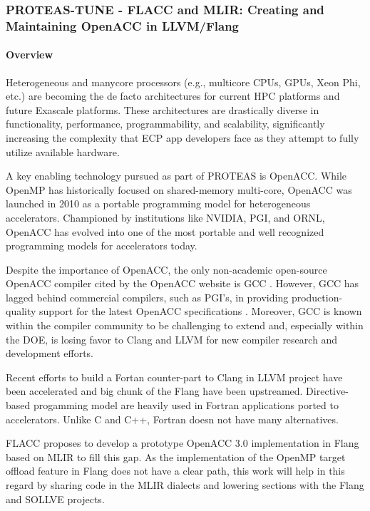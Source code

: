 \subsubsection{ PROTEAS-TUNE - FLACC and MLIR: Creating and Maintaining OpenACC in LLVM/Flang}\label{s:flacc}

\paragraph{Overview}
Heterogeneous and manycore processors (e.g., multicore CPUs, GPUs,
Xeon Phi, etc.) are becoming the de facto architectures for current
HPC platforms and future Exascale platforms.  These architectures are
drastically diverse in functionality, performance, programmability,
and scalability, significantly increasing the complexity that ECP app
developers face as they attempt to fully utilize available hardware.

A key enabling technology pursued as part of PROTEAS is OpenACC.
While OpenMP has historically focused on shared-memory multi-core,
OpenACC was launched in 2010 as a portable programming model for
heterogeneous accelerators.  Championed by institutions like NVIDIA,
PGI, and ORNL, OpenACC has evolved into one of the most portable and
well recognized programming models for accelerators today.

Despite the importance of OpenACC, the only non-academic open-source OpenACC
compiler cited by the OpenACC website is GCC \cite{openaccOrgTools}.
However, GCC has lagged behind commercial compilers, such as PGI's, in
providing production-quality support for the latest OpenACC specifications
\cite{openACCValidationSuite}.  Moreover, GCC is known within the compiler
community to be challenging to extend and, especially within the DOE, is
losing favor to Clang and LLVM for new compiler research and development
efforts.

Recent efforts to build a Fortan counter-part to Clang in LLVM project have
been accelerated and big chunk of the Flang have been upstreamed.
Directive-based progamming model are heavily used in Fortran applications ported
to accelerators. Unlike C and C++, Fortran doesn not have many alternatives.

FLACC proposes to develop a prototype OpenACC 3.0 implementation in Flang based
on MLIR to fill this gap. As the implementation of the OpenMP target offload
feature in Flang does not have a clear path, this work will help in this regard
by sharing code in the MLIR dialects and lowering sections with the Flang and
SOLLVE projects.

